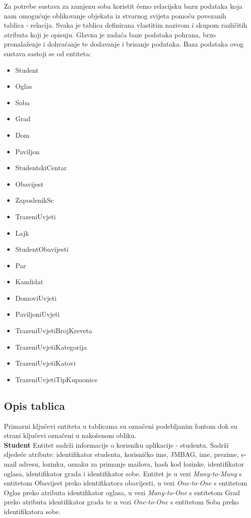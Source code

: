 	Za potrebe sustava za zamjenu soba koristit ćemo relacijsku bazu podataka koja nam omogućuje oblikovanje objekata iz stvarnog svijeta pomoću povezanih tablica - relacija. Svaka je tablica definirana vlastitim nazivom i skupom različitih atributa koji je opisuju. Glavna je zadaća baze podataka pohrana, brzo pronalaženje i dohvaćanje te dodavanje i brisanje podataka. Baza podataka ovog sustava sastoji se od entiteta:
	\begin{itemize}
		\item Student
		\item Oglas
		\item Soba
		\item Grad
		\item Dom
		\item Paviljon
		\item StudentskiCentar
		\item Obavijest
		\item ZaposlenikSc
		\item TrazeniUvjeti
		\item Lajk
		\item StudentObavijesti
		\item Par
		\item Kandidat
		\item DomoviUvjeti
		\item PaviljoniUvjeti
		\item TrazeniUvjetiBrojKreveta
		\item TrazeniUvjetiKategorija
		\item TrazeniUvjetiKatovi
		\item TrazeniUvjetiTipKupaonice
		\\
		
	\end{itemize}
	
	\subsection{Opis tablica}
	
	Primarni ključevi entiteta u tablicama su označeni podebljanim fontom dok su strani ključevi označeni u nakošenom obliku.\\
	
	
	
	\textbf{Student } Entitet sadrži informacije o korisniku aplikacije - studentu. Sadrži sljedeće atribute: identifikator studenta, korisničko ime, JMBAG, ime, prezime, e-mail adresu, lozinku, oznaku za primanje mailova, hash kod lozinke, identifikator oglasa, identifikator grada i identifikator sobe. Entitet je u vezi \textit{Many-to-Many} s entitetom Obavijest preko identifikatora obavijesti,  u vezi \textit{One-to-One} s entitetom Oglas preko atributa identifikator oglasa, u vezi \textit{Many-to-One} s entitetom Grad preko atributa identifikator grada te u vezi \textit{One-to-One} s entitetom Soba preko identifikatora sobe.
	
